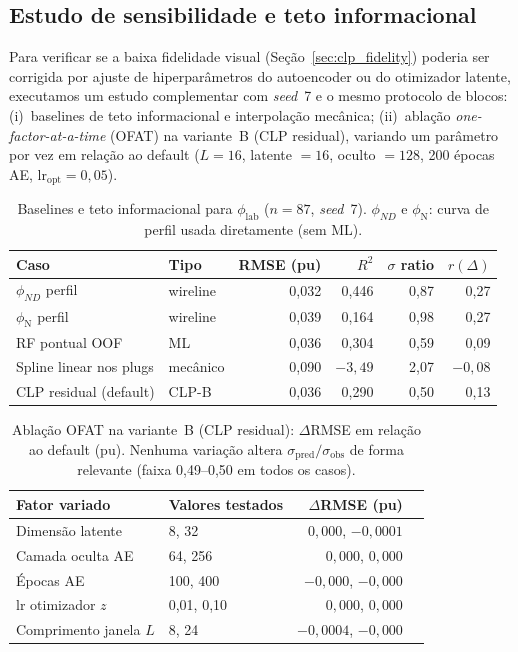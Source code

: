 \documentclass[11pt,a4paper]{article}
\newcommand{\philab}{\ensuremath{\phi_{\mathrm{lab}}}}
\newcommand{\phiN}{\ensuremath{\phi_{\mathrm{N}}}}
\begin{document}
\subsection{Estudo de sensibilidade e teto informacional}
\label{sec:clp_sensitivity}

Para verificar se a baixa fidelidade visual
(Seção~\ref{sec:clp_fidelity}) poderia ser corrigida por ajuste de
hiperparâmetros do autoencoder ou do otimizador latente, executamos um
estudo complementar com \emph{seed}~7 e o mesmo protocolo de blocos:
(i)~baselines de teto informacional e interpolação mecânica;
(ii)~ablação \emph{one-factor-at-a-time} (OFAT) na variante~B
(CLP residual), variando um parâmetro por vez em relação ao
default ($L=16$, latente $=16$, oculto $=128$, 200 épocas AE,
lr$_{\mathrm{opt}}=0{,}05$).

\begin{table}[H]
  \centering
  \caption{Baselines e teto informacional para \philab{} ($n=87$,
           \emph{seed}~7). $\phi_{ND}$ e \phiN{}: curva de perfil
           usada diretamente (sem ML).}
  \label{tab:clp_sensitivity_baselines}
  \small
  \begin{tabular}{llrrrr}
    \toprule
    Caso & Tipo & RMSE (pu) & $R^2$ & $\sigma$ ratio & $r(\Delta)$ \\
    \midrule
    $\phi_{ND}$ perfil & wireline & 0,032 & 0,446 & 0,87 & 0,27 \\
    \phiN{} perfil & wireline & 0,039 & 0,164 & 0,98 & 0,27 \\
    RF pontual OOF & ML & 0,036 & 0,304 & 0,59 & 0,09 \\
    Spline linear nos plugs & mecânico & 0,090 & $-3{,}49$ & 2,07 & $-0{,}08$ \\
    CLP residual (default) & CLP-B & 0,036 & 0,290 & 0,50 & 0,13 \\
    \bottomrule
  \end{tabular}
\end{table}

\begin{table}[H]
  \centering
  \caption{Ablação OFAT na variante~B (CLP residual): $\Delta$RMSE em
           relação ao default (pu). Nenhuma variação altera
           $\sigma_{\mathrm{pred}}/\sigma_{\mathrm{obs}}$ de forma
           relevante (faixa 0,49--0,50 em todos os casos).}
  \label{tab:clp_sensitivity_ofat}
  \small
  \begin{tabular}{llrr}
    \toprule
    Fator variado & Valores testados & $\Delta$RMSE (pu) \\
    \midrule
    Dimensão latente & 8, 32 & $0{,}000$, $-0{,}0001$ \\
    Camada oculta AE & 64, 256 & $0{,}000$, $0{,}000$ \\
    Épocas AE & 100, 400 & $-0{,}000$, $-0{,}000$ \\
    lr otimizador $z$ & 0,01, 0,10 & $0{,}000$, $0{,}000$ \\
    Comprimento janela $L$ & 8, 24 & $-0{,}0004$, $-0{,}000$ \\
    \bottomrule
  \end{tabular}
\end{table}
\end{document}
